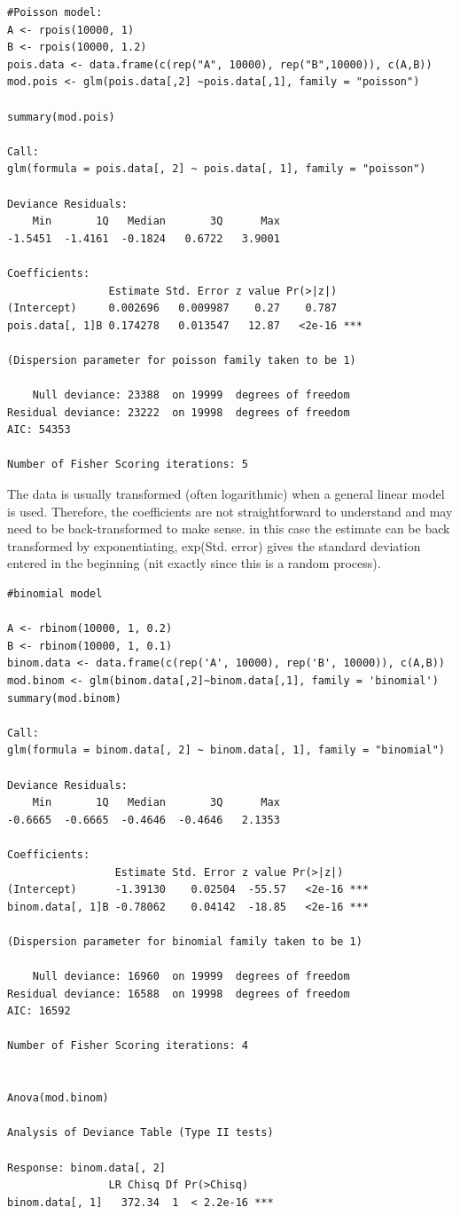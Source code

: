 \documentclass{article}
\begin{document}
\begin{lstlisting}
#Poisson model:
A <- rpois(10000, 1)
B <- rpois(10000, 1.2) 
pois.data <- data.frame(c(rep("A", 10000), rep("B",10000)), c(A,B))
mod.pois <- glm(pois.data[,2] ~pois.data[,1], family = "poisson")

summary(mod.pois)

Call:
glm(formula = pois.data[, 2] ~ pois.data[, 1], family = "poisson")

Deviance Residuals: 
    Min       1Q   Median       3Q      Max  
-1.5451  -1.4161  -0.1824   0.6722   3.9001  

Coefficients:
                Estimate Std. Error z value Pr(>|z|)    
(Intercept)     0.002696   0.009987    0.27    0.787    
pois.data[, 1]B 0.174278   0.013547   12.87   <2e-16 ***

(Dispersion parameter for poisson family taken to be 1)

    Null deviance: 23388  on 19999  degrees of freedom
Residual deviance: 23222  on 19998  degrees of freedom
AIC: 54353

Number of Fisher Scoring iterations: 5
\end{lstlisting}

The data is usually transformed (often logarithmic) when a general linear model is used. Therefore, the coefficients are not straightforward to understand and may need to be back-transformed to make sense. in this case the estimate can be back transformed by exponentiating, exp(Std. error) gives the standard deviation entered in the beginning (nit exactly since this is a random process).

\begin{lstlisting}
#binomial model

A <- rbinom(10000, 1, 0.2)
B <- rbinom(10000, 1, 0.1)
binom.data <- data.frame(c(rep('A', 10000), rep('B', 10000)), c(A,B))
mod.binom <- glm(binom.data[,2]~binom.data[,1], family = 'binomial')
summary(mod.binom)

Call:
glm(formula = binom.data[, 2] ~ binom.data[, 1], family = "binomial")

Deviance Residuals: 
    Min       1Q   Median       3Q      Max  
-0.6665  -0.6665  -0.4646  -0.4646   2.1353  

Coefficients:
                 Estimate Std. Error z value Pr(>|z|)    
(Intercept)      -1.39130    0.02504  -55.57   <2e-16 ***
binom.data[, 1]B -0.78062    0.04142  -18.85   <2e-16 ***

(Dispersion parameter for binomial family taken to be 1)

    Null deviance: 16960  on 19999  degrees of freedom
Residual deviance: 16588  on 19998  degrees of freedom
AIC: 16592

Number of Fisher Scoring iterations: 4


Anova(mod.binom)

Analysis of Deviance Table (Type II tests)

Response: binom.data[, 2]
                LR Chisq Df Pr(>Chisq)    
binom.data[, 1]   372.34  1  < 2.2e-16 ***

\end{lstlisting}
\end{document}

